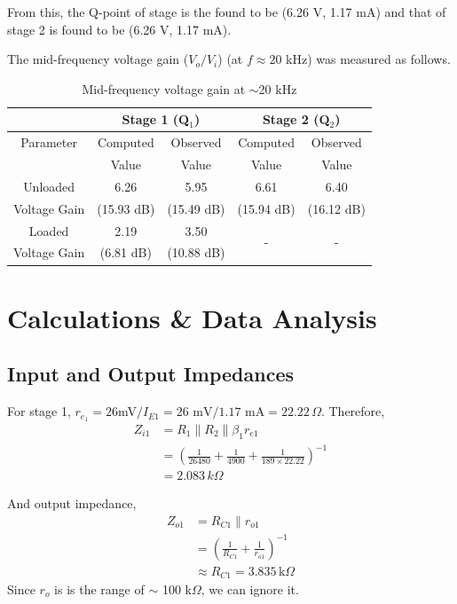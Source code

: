 From this, the Q-point of stage is the found to be (6.26 V, 1.17 mA) and that of stage 2 is found to be (6.26 V, 1.17 mA).

The mid-frequency voltage gain ($V_o/V_i$) (at $f \approx 20$ kHz) was measured as follows.

\begin{table}[H]
    \centering
    \begin{tabular}{|c|c|c|c|c|}
    \hline
     & \multicolumn{2}{|c|}{Stage 1 (Q$_1$)} & \multicolumn{2}{|c|}{Stage 2 (Q$_2$)} \\ \hline
    Parameter & Computed  & Observed  & Computed  & Observed\\
     &  Value &  Value &  Value &  Value\\ \hline
    Unloaded  & \multirow{1}{*}{6.26}  &  \multirow{1}{*}{5.95} & \multirow{1}{*}{6.61}  &  \multirow{1}{*}{6.40} \\
    Voltage Gain        & (15.93 dB)   & (15.49 dB)             & (15.94 dB)          &  (16.12 dB) \\ \hline
    Loaded & \multirow{1}{*}{2.19} & \multirow{1}{*}{3.50} & \multirow{2}{*}{-}  &  \multirow{2}{*}{-} \\
    Voltage Gain& (6.81 dB) & (10.88 dB)  & &   \\
    \hline
    \end{tabular}
    \caption{Mid-frequency voltage gain at $\sim$20 kHz}
    \label{tab:3}
\end{table}

\section{Calculations \& Data Analysis}

\subsection*{Input and Output Impedances}
For stage 1, $r_{e_1}=26$mV$/I_{E1}=26\text{ mV}/1.17\text{ mA}=22.22\,\Omega$. Therefore,
\begin{align*}
    Z_{i1} &= R_1 \parallel R_2 \parallel \beta_1 r_{e1}\\
    &= \left( \frac{1}{26480} + \frac{1}{4900} + \frac{1}{189 \times 22.22} \right)^{-1}\\
    &= 2.083\,k\Omega
\end{align*}

And output impedance,
\begin{align*}
    Z_{o1} &= R_{C1} \parallel r_{o1} \\
    &= \left( \frac{1}{R_{C1}}+\frac{1}{r_{o1}}\right)^{-1} \\
    &\approx R_{C1}=3.835\,\text{k}\Omega
\end{align*}
Since $r_o$ is is the range of $\sim$ 100 k$\Omega$, we can ignore it.

